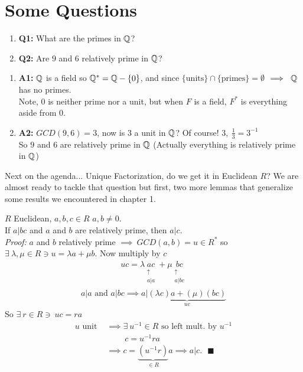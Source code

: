 \section*{Some Questions}
\begin{enumerate}
    \item \textbf{Q1:} What are the primes in ${\mathbb{ Q}}$? 
    \item \textbf{Q2:} Are $9$ and $6$ relatively prime in ${\mathbb{ Q}}$?
\end{enumerate}
\vspace{0.25in}
\begin{enumerate}
    \item \textbf{A1:} ${\mathbb{ Q}}$ is a field so ${\mathbb{ Q}}^*={\mathbb{ Q}}-\{0\}$, and since $\{\text{units}\}\cap \{\text{primes}\} =\emptyset$ $\implies \ {\mathbb{ Q}}$ has no primes. \\
    Note, $0$ is neither prime nor a unit, but when $F$ is a field, $F^*$ is everything aside from $0$.
    \item \textbf{A2:} $GCD(9,6)=3$, now is $3$ a unit in ${\mathbb{ Q}}$? Of course! $3,\ \frac{1}{3}=3^{-1}$ \\
    So $9$ and $6$ are relatively prime in ${\mathbb{ Q}}$ (Actually everything is relatively prime in ${\mathbb{ Q}}$)
\end{enumerate}
\vspace{0.2in}
\noindent Next on the agenda... Unique Factorization, do we get it in Euclidean $R$? We are almost ready to tackle that question but first, two more lemmas that generalize some results we encountered in chapter 1.
\begin{lemma}
    $R$ Euclidean, $a,b,c \in R$ $a,b \neq 0$.\\
If $a | bc$  and $a$ and $b$ are relatively prime, then $a|c$. \\

\noindent \textit{Proof: } $a$ and $b$ relatively prime $\implies \ GCD(a,b)=u \in R^*$ so $\exists \ \lambda, \mu \in R \ni u=\lambda a + \mu b$. Now multiply by $c$
\begin{align*}
    uc = \lambda \underset{\substack{\uparrow \\ a|a}}{ac} + \mu \underset{\substack{\uparrow \\ a|bc}}{bc}
\end{align*}
\begin{align*}
    a|a \text{ and }a|bc \implies a | \underbrace{(\lambda c)a+ (\mu)(bc)}_{uc}
\end{align*}
So $\exists \ r\in R \ni \ uc=ra$
\begin{align*}
    u \text{ unit } & \implies \exists \ u^{-1}\in R \text{ so left mult. by }u^{-1} \\
    & \ \ \ \ \ \ \ \ \ \ c=u^{-1}ra \\
    &\implies c= \underbrace{(u^{-1}r)}_{\in R} a \implies a|c.  \ \ \ \blacksquare 
\end{align*}
\end{lemma}

